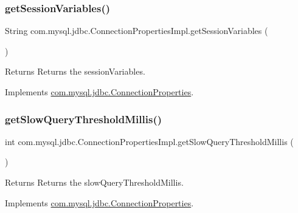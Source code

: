 \subsubsection{\texorpdfstring{get\+Session\+Variables()}{getSessionVariables()}}
{\footnotesize\ttfamily String com.\+mysql.\+jdbc.\+Connection\+Properties\+Impl.\+get\+Session\+Variables (\begin{DoxyParamCaption}{ }\end{DoxyParamCaption})}

\begin{DoxyReturn}{Returns}
Returns the session\+Variables. 
\end{DoxyReturn}


Implements \mbox{\hyperlink{interfacecom_1_1mysql_1_1jdbc_1_1_connection_properties_ad63fb7021671197a1bdf1d314420a224}{com.\+mysql.\+jdbc.\+Connection\+Properties}}.

\mbox{\label{classcom_1_1mysql_1_1jdbc_1_1_connection_properties_impl_a44ae0735a78fd030465427632a56cd41}} 
\subsubsection{\texorpdfstring{get\+Slow\+Query\+Threshold\+Millis()}{getSlowQueryThresholdMillis()}}
{\footnotesize\ttfamily int com.\+mysql.\+jdbc.\+Connection\+Properties\+Impl.\+get\+Slow\+Query\+Threshold\+Millis (\begin{DoxyParamCaption}{ }\end{DoxyParamCaption})}

\begin{DoxyReturn}{Returns}
Returns the slow\+Query\+Threshold\+Millis. 
\end{DoxyReturn}


Implements \mbox{\hyperlink{interfacecom_1_1mysql_1_1jdbc_1_1_connection_properties_a6c2698e485ad9ad410bceff09e3835f0}{com.\+mysql.\+jdbc.\+Connection\+Properties}}.

\mbox{\label{classcom_1_1mysql_1_1jdbc_1_1_connection_properties_impl_a3576357d3959c1343a9d36aea30e6640}} 

